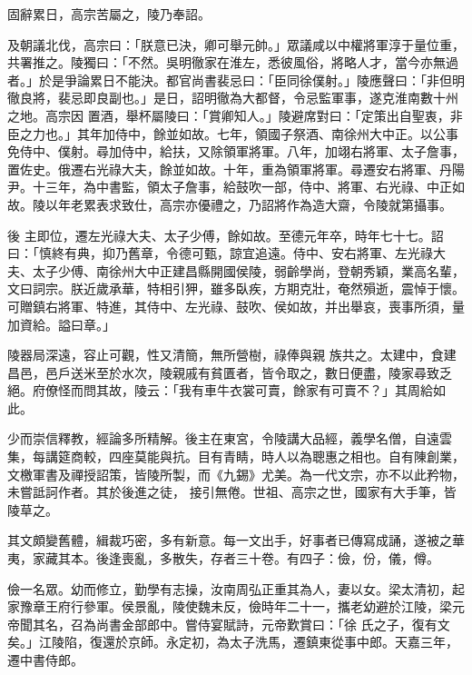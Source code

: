 \begin{pinyinscope}
 固辭累日，高宗苦屬之，陵乃奉詔。



 及朝議北伐，高宗曰：「朕意已決，卿可舉元帥。」眾議咸以中權將軍淳于量位重，共署推之。陵獨曰：「不然。吳明徹家在淮左，悉彼風俗，將略人才，當今亦無過者。」於是爭論累日不能決。都官尚書裴忌曰：「臣同徐僕射。」陵應聲曰：「非但明徹良將，裴忌即良副也。」是日，詔明徹為大都督，令忌監軍事，遂克淮南數十州之地。高宗因
 置酒，舉杯屬陵曰：「賞卿知人。」陵避席對曰：「定策出自聖衷，非臣之力也。」其年加侍中，餘並如故。七年，領國子祭酒、南徐州大中正。以公事免侍中、僕射。尋加侍中，給扶，又除領軍將軍。八年，加翊右將軍、太子詹事，置佐史。俄遷右光祿大夫，餘並如故。十年，重為領軍將軍。尋遷安右將軍、丹陽尹。十三年，為中書監，領太子詹事，給鼓吹一部，侍中、將軍、右光祿、中正如故。陵以年老累表求致仕，高宗亦優禮之，乃詔將作為造大齋，令陵就第攝事。



 後
 主即位，遷左光祿大夫、太子少傅，餘如故。至德元年卒，時年七十七。詔曰：「慎終有典，抑乃舊章，令德可甄，諒宜追遠。侍中、安右將軍、左光祿大夫、太子少傅、南徐州大中正建昌縣開國侯陵，弱齡學尚，登朝秀穎，業高名輩，文曰詞宗。朕近歲承華，特相引狎，雖多臥疾，方期克壯，奄然殞逝，震悼于懷。可贈鎮右將軍、特進，其侍中、左光祿、鼓吹、侯如故，并出舉哀，喪事所須，量加資給。謚曰章。」



 陵器局深遠，容止可觀，性又清簡，無所營樹，祿俸與親
 族共之。太建中，食建昌邑，邑戶送米至於水次，陵親戚有貧匱者，皆令取之，數日便盡，陵家尋致乏絕。府僚怪而問其故，陵云：「我有車牛衣裳可賣，餘家有可賣不？」其周給如此。



 少而崇信釋教，經論多所精解。後主在東宮，令陵講大品經，義學名僧，自遠雲集，每講筵商較，四座莫能與抗。目有青睛，時人以為聰惠之相也。自有陳創業，文檄軍書及禪授詔策，皆陵所製，而《九錫》尤美。為一代文宗，亦不以此矜物，未嘗詆訶作者。其於後進之徒，
 接引無倦。世祖、高宗之世，國家有大手筆，皆陵草之。



 其文頗變舊體，緝裁巧密，多有新意。每一文出手，好事者已傳寫成誦，遂被之華夷，家藏其本。後逢喪亂，多散失，存者三十卷。有四子：儉，份，儀，僔。



 儉一名眾。幼而修立，勤學有志操，汝南周弘正重其為人，妻以女。梁太清初，起家豫章王府行參軍。侯景亂，陵使魏未反，儉時年二十一，攜老幼避於江陵，梁元帝聞其名，召為尚書金部郎中。嘗侍宴賦詩，元帝歎賞曰：「徐
 氏之子，復有文矣。」江陵陷，復還於京師。永定初，為太子洗馬，遷鎮東從事中郎。天嘉三年，遷中書侍郎。




\end{pinyinscope}
